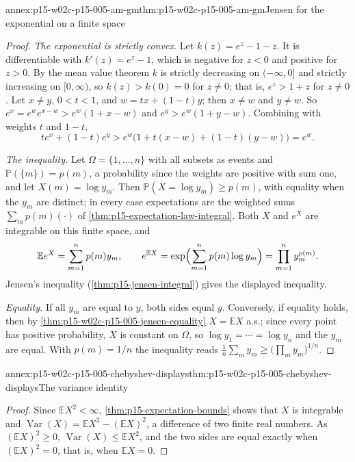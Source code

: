 \begin{annexitem}{annex:p15-w02c-p15-005-am-gm}{thm:p15-w02c-p15-005-am-gm}{Jensen for the exponential on a finite space}
\begin{proof}
\emph{The exponential is strictly convex.} Let
\(k(z)=e^z-1-z\). It is differentiable with \(k'(z)=e^z-1\), which is
negative for \(z<0\) and positive for \(z>0\). By the mean value
theorem \(k\) is strictly decreasing on \((-\infty,0]\) and strictly
increasing on \([0,\infty)\), so \(k(z)>k(0)=0\) for \(z\neq0\); that
is, \(e^z>1+z\) for \(z\neq0\). Let \(x\neq y\), \(0<t<1\), and
\(w=tx+(1-t)y\); then \(x\neq w\) and \(y\neq w\). So
\(e^x=e^we^{x-w}>e^w(1+x-w)\) and \(e^y>e^w(1+y-w)\). Combining with
weights \(t\) and \(1-t\),
\[
 te^x+(1-t)e^y>e^w\bigl(1+t(x-w)+(1-t)(y-w)\bigr)=e^w .
\]

\emph{The inequality.} Let \(\Omega=\{1,\ldots,n\}\) with all subsets as
events and \(\mathbb P(\{m\})=p(m)\), a probability since the weights are
positive with sum one, and let \(X(m)=\log y_m\). Then
\(\mathbb P(X=\log y_m)\geq p(m)\), with equality when the \(y_m\) are
distinct; in every case expectations are the weighted sums
\(\sum_mp(m)(\cdot)\) of \cref{thm:p15-expectation-law-integral}. Both
\(X\) and \(e^X\) are integrable on this finite space, and
\[
 \mathbb Ee^X=\sum_{m=1}^np(m)y_m,
 \qquad
 e^{\mathbb EX}=\exp\Bigl(\sum_{m=1}^np(m)\log y_m\Bigr)
 =\prod_{m=1}^ny_m^{p(m)} .
\]
Jensen's inequality (\cref{thm:p15-jensen-integral}) gives the
displayed inequality.

\emph{Equality.} If all \(y_m\) are equal to \(y\), both sides equal
\(y\). Conversely, if equality holds, then by
\cref{thm:p15-w02c-p15-005-jensen-equality} \(X=\mathbb EX\) a.s.;
since every point has positive probability, \(X\) is constant on
\(\Omega\), so \(\log y_1=\cdots=\log y_n\) and the \(y_m\) are equal.
With \(p(m)=1/n\) the inequality reads
\(\frac1n\sum_my_m\geq\bigl(\prod_my_m\bigr)^{1/n}\).
\end{proof}
\end{annexitem}

\begin{annexitem}{annex:p15-w02c-p15-005-chebyshev-displays}{thm:p15-w02c-p15-005-chebyshev-displays}{The variance identity}
\begin{proof}
Since \(\mathbb EX^2<\infty\), \cref{thm:p15-expectation-bounds} shows
that \(X\) is integrable and
\(\operatorname{Var}(X)=\mathbb EX^2-(\mathbb EX)^2\), a difference of
two finite real numbers. As \((\mathbb EX)^2\geq0\),
\(\operatorname{Var}(X)\leq\mathbb EX^2\), and the two sides are equal
exactly when \((\mathbb EX)^2=0\), that is, when \(\mathbb EX=0\).
\end{proof}
\end{annexitem}


